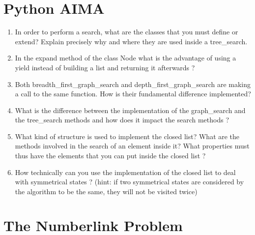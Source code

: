 \section{Python AIMA}

\begin{enumerate}
    \item In order to perform a search, what are the classes that you
        must define or extend? Explain precisely why and where they are
        used inside a tree\_search.
    \item In the expand method of the class Node what is the advantage
        of using a yield instead of building a list and returning it
        afterwards ?
    \item Both breadth\_first\_graph\_search and depth\_first\_graph\_search
        are making a call to the same function. How is their fundamental
        difference implemented?
    \item What is the difference between the implementation of the
        graph\_search and the tree\_search methods and how does it impact
        the search methods ?
    \item What kind of structure is used to implement the closed list?
        What are the methods involved in the search of an element inside
        it? What properties must thus have the elements that you can put
        inside the closed list ?
    \item How technically can you use the implementation of the closed
        list to deal with symmetrical states ? (hint: if two symmetrical
        states are considered by the algorithm to be the same, they will
        not be visited twice)
\end{enumerate}

\section{The Numberlink Problem}

